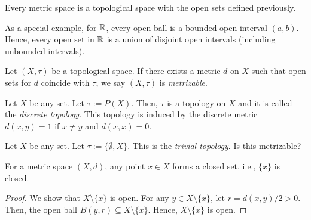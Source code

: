 \begin{example}
\begin{center}
\end{center}
\end{example}

\begin{example}
  Every metric space is a topological space with the open sets defined previously.
  
  As a special example, for $\mathbb{R}$, every open ball is a bounded open interval $(a,b)$. Hence, every open set in $\mathbb{R}$ is a union of disjoint open intervals (including unbounded intervals).

  Let $(X,\tau)$ be a topological space. If there exists a metric $d$ on $X$ such that open sets for $d$ coincide with $\tau$, we say $(X,\tau)$ is \emph{metrizable}.
\end{example}


\begin{example}
  Let $X$ be any set. Let ${\tau}:=P(X)$. Then, ${\tau}$ is a topology on $X$ and it is called the \emph{discrete topology}. This topology is induced by the discrete metric $d(x,y)=1$ if $x\neq y$ and $d(x,x)=0$.
\end{example}

\begin{example}
  Let $X$ be any set. Let ${\tau}:=\{\emptyset,X\}$. This is the \emph{trivial topology}. Is this metrizable?
\end{example}

\begin{lemma}
  For a metric space $(X,d)$, any point $x\in X$ forms a closed set, i.e., $\{x\}$ is closed.
\end{lemma}
\begin{proof}
  We show that $X\setminus\{x\}$ is open. For any $y\in X\setminus\{x\}$, let $r=d(x,y)/2>0$. Then, the open ball $B(y,r)\subseteq X\setminus\{x\}$. Hence, $X\setminus\{x\}$ is open.
\end{proof}

